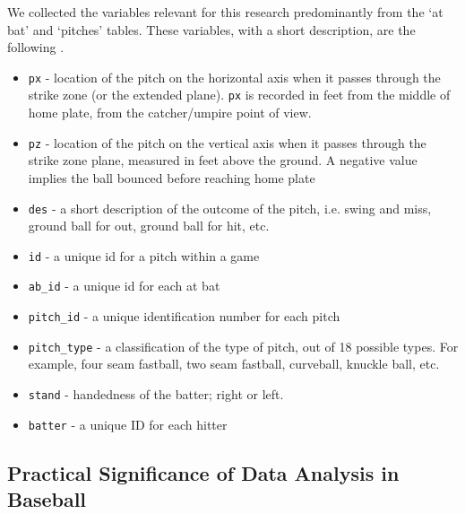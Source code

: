 \documentclass{article}
\begin{document}
We collected the variables relevant for this research predominantly from the `at bat' and `pitches' tables. These variables, with a short description, are the following \citep{Fast2007}.
  \begin{itemize}
  \item \verb|px| - location of the pitch on the horizontal axis when it passes through the strike zone (or the extended plane). \verb|px| is recorded in feet from the middle of home plate, from the catcher/umpire point of view.
  \item \verb|pz| - location of the pitch on the vertical axis when it passes through the strike zone plane, measured in feet above the ground. A negative value implies the ball bounced before reaching home plate
  \item \verb|des| - a short description of the outcome of the pitch, i.e. swing and miss, ground ball for out, ground ball for hit, etc.  
  \item \verb|id| - a unique id for a pitch within a game
  \item \verb|ab_id| - a unique id for each at bat  
  \item \verb|pitch_id| - a unique identification number for each pitch
  \item \verb|pitch_type| - a classification of the type of pitch, out of 18 possible types. For example, four seam fastball, two seam fastball, curveball, knuckle ball, etc.
  \item \verb|stand| - handedness of the batter; right or left.
  \item \verb|batter| - a unique ID for each hitter
  \end{itemize}


\subsection{Practical Significance of Data Analysis in Baseball}
\end{document}
